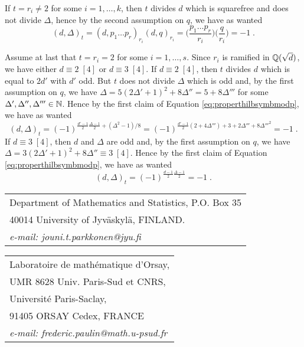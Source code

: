 \documentclass[11pt]{article}
\begin{document}
If $t=r_i\neq 2$ for some $i=1,\dots, k$, then $t$ divides $d$ which
is squarefree and does not divide $\Delta$, hence by the second
assumption on $q$, we have as wanted
$$
(d,\Delta)_t=(d,p_1\dots p_r)_{r_i}(d,q)_{r_i}= 
\big(\frac{p_1\dots p_r}{r_i}\big)\big(\frac{q}{r_i}\big)=-1\;.
$$ 

Assume at last that $t=r_i=2$ for some $i=1,\dots, s$. Since $r_i$ is
ramified in ${\mathbb Q}(\sqrt{d})$, we have either $d\equiv 2\;[4]$ or
$d\equiv 3\;[4]$. If $d\equiv 2\;[4]$, then $t$ divides $d$ which is
equal to $2d'$ with $d'$ odd. But $t$ does not divide $\Delta$ which
is odd and, by the first assumption on $q$, we have $\Delta=
5(2\Delta'+1)^2+8\Delta''=5+8\Delta'''$ for some $\Delta', \Delta'',
\Delta'''\in{\mathbb N}$. Hence by the first claim of Equation
\eqref{eq:properthilbsymbmodp}, we have as wanted
$$
(d,\Delta)_t=(-1)^{\frac{d'-1}{2}\frac{\Delta-1}{2}+ (\Delta^2-1)/8}=
(-1)^{\frac{d'-1}{2}(2+4\Delta''') + 3+2\Delta'''+8{\Delta'''}^2}=-1\;.
$$ 
If $d\equiv 3\;[4]$, then $d$ and $\Delta$ are odd and, by the first
assumption on $q$, we have $\Delta= 3(2\Delta'+1)^2 +8\Delta''\equiv
3\;[4]$. Hence by the first claim of Equation
\eqref{eq:properthilbsymbmodp}, we have as wanted
$$
(d,\Delta)_t=(-1)^{\frac{d-1}{2}\frac{\Delta-1}{2}}=-1\;.
$$ 

%  
% 
{\small  }

\bigskip
{\small
\noindent \begin{tabular}{l} 
Department of Mathematics and Statistics, P.O. Box 35\\ 
40014 University of Jyv\"askyl\"a, FINLAND.\\
{\it e-mail: jouni.t.parkkonen@jyu.fi}
\end{tabular}
\medskip


\noindent \begin{tabular}{l}
Laboratoire de mathématique d'Orsay,\\
UMR 8628 Univ. Paris-Sud et CNRS,\\
Universit\'e Paris-Saclay,\\
91405 ORSAY Cedex, FRANCE\\
{\it e-mail: frederic.paulin@math.u-psud.fr}
\end{tabular}
}
\end{document}
